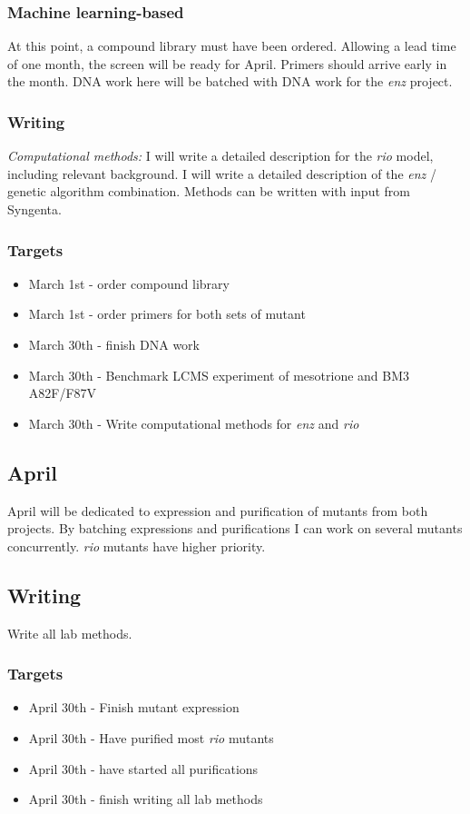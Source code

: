 \documentclass{article}
\begin{document}
\subsubsection{Machine learning-based}
At this point, a compound library must have been ordered. Allowing a lead time of one month, the screen will be ready for April. %
Primers should arrive early in the month. DNA work here will be  batched with DNA work for the \textit{enz} project. %
\subsubsection{Writing}
\textit{Computational methods:} %
I will write a detailed description for the \textit{rio} model, including relevant background.  %
I will write a detailed description of the \textit{enz} / genetic algorithm combination. %
Methods can be written with input from Syngenta. %

\subsubsection{Targets}
\begin{itemize}
\item March 1st - order compound library
\item March 1st - order primers for both sets of mutant 
\item March 30th - finish DNA work
\item March 30th - Benchmark LCMS experiment of mesotrione and BM3 A82F/F87V 
\item March 30th - Write computational methods for \textit{enz} and \textit{rio}
\end{itemize}

\subsection{April}
April will be dedicated to expression and purification of mutants from both projects. By batching expressions and purifications I can work on several  mutants concurrently. \textit{rio} mutants have higher priority. 
\subsection{Writing}
Write all lab methods.
\subsubsection{Targets}
\begin{itemize}
\item April 30th - Finish mutant expression 
\item April 30th - Have purified most \textit{rio} mutants
\item April 30th - have started all purifications
\item April 30th - finish writing all lab methods
\end{itemize}
\end{document}

